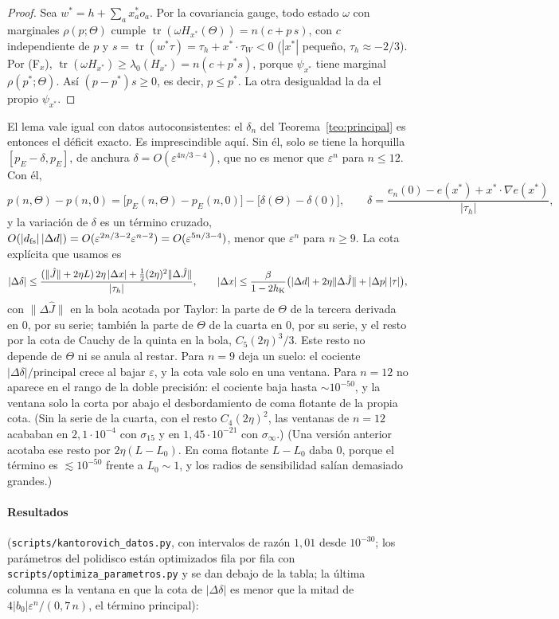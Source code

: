 \documentclass[11pt,a4paper]{article}
\theoremstyle{definition}
\theoremstyle{remark}
\newcommand{\tr}{\operatorname{tr}}
\newcommand{\eps}{\varepsilon}
\newcommand{\pE}{p_{E}}
\newcommand{\scr}[1]{\texttt{scripts/#1}}
\begin{document}
\begin{proof}
Sea $w^*=h+\sum_ax^*_ao_a$. Por la covariancia gauge, todo estado $\omega$ con marginales $\rho(p;\Theta)$ cumple
$\tr(\omega H_{x^*}(\Theta))=n(c+p\,s)$, con $c$ independiente de $p$ y $s=\tr(w^*\tau)=\tau_h+x^*\!\cdot\tau_W<0$
($|x^*|$ pequeño, $\tau_h\approx-2/3$). Por (F$_x$), $\tr(\omega H_{x^*})\ge\lambda_0(H_{x^*})=n(c+p^*s)$, porque
$\psi_{x^*}$ tiene marginal $\rho(p^*;\Theta)$. Así $(p-p^*)s\ge0$, es decir, $p\le p^*$. La otra desigualdad la da
el propio $\psi_{x^*}$.
\end{proof}

\noindent
El lema vale igual con datos autoconsistentes: el $\delta_n$ del Teorema~\ref{teo:principal} es entonces el
déficit exacto. Es imprescindible aquí. Sin él, solo se tiene la horquilla $[\pE-\delta,\pE]$, de anchura
$\delta=O(\eps^{4n/3-4})$, que no es menor que $\eps^n$ para $n\le12$. Con él,
\[
  p(n,\Theta)-p(n,0)=\big[\pE(n,\Theta)-\pE(n,0)\big]-\big[\delta(\Theta)-\delta(0)\big],\qquad
  \delta=\frac{e_n(0)-e(x^*)+x^*\!\cdot\nabla e(x^*)}{|\tau_h|},
\]
y la variación de $\delta$ es un término cruzado, $O(|d_{\rm fs}|\,|\Delta d|)=O(\eps^{2n/3-2}\eps^{n-2})=
O(\eps^{5n/3-4})$, menor que $\eps^n$ para $n\ge9$. La cota explícita que usamos es
\[
  |\Delta\delta|\le\frac{(\|\hat J\|+2\eta L)\,2\eta\,|\Delta x|+\tfrac12(2\eta)^2\|\Delta\hat J\|}{|\tau_h|},\qquad
  |\Delta x|\le\frac{\beta}{1-2h_{\rm K}}\big(|\Delta d|+2\eta\|\Delta\hat J\|+|\Delta p|\,|\tau|\big),
\]
con $\|\Delta\hat J\|$ en la bola acotada por Taylor: la parte de $\Theta$ de la tercera derivada en $0$, por su
serie; también la parte de $\Theta$ de la cuarta en $0$, por su serie, y el resto por la cota de Cauchy
de la quinta en la bola, $C_5(2\eta)^3/3$. Este resto no depende de $\Theta$ ni se anula al restar. Para $n=9$
deja un suelo: el cociente $|\Delta\delta|/\text{principal}$ crece al bajar $\eps$, y la cota vale solo en una
ventana. Para $n=12$ no aparece en el rango de la doble precisión: el cociente baja hasta $\sim10^{-50}$, y la
ventana solo la corta por abajo el desbordamiento de coma flotante de la propia cota. (Sin la serie de la
cuarta, con el resto $C_4(2\eta)^2$, las ventanas de $n=12$ acababan en $2{,}1\cdot10^{-4}$ con $\sigma_{15}$
y en $1{,}45\cdot10^{-21}$ con $\sigma_\infty$.) (Una versión anterior acotaba ese resto por $2\eta(L-L_0)$. En coma flotante
$L-L_0$ daba $0$, porque el término es $\lesssim10^{-50}$ frente a $L_0\sim1$, y los radios de sensibilidad
salían demasiado grandes.)

\paragraph{Resultados} (\scr{kantorovich\_datos.py}, con intervalos de razón $1{,}01$ desde $10^{-30}$; los
parámetros del polidisco están optimizados fila por fila con \scr{optimiza\_parametros.py} y se dan debajo de la
tabla; la última columna es la ventana en que la cota de $|\Delta\delta|$ es menor que la mitad de
$4|b_0|\eps^n/(0{,}7\,n)$, el término principal):
\end{document}
